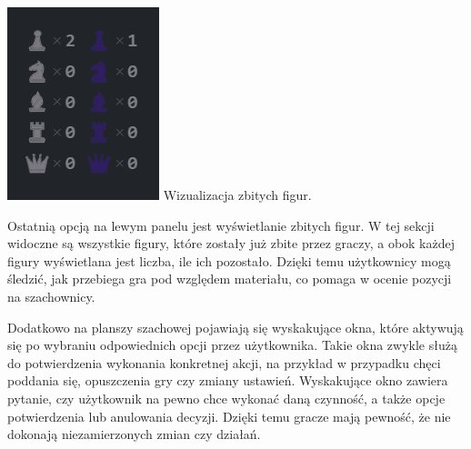 \documentclass[12pt,a4paper]{article}
\begin{document}
\begin{minipage}[t]{0.2\textwidth} 
    \vspace{0pt} 
    \centering 
    \includegraphics[width=\linewidth]{images/ins_min_capt.png} 
    Wizualizacja zbitych figur.
\end{minipage} 
\hfill 
\begin{minipage}[t]{0.7\textwidth} 
    \vspace{0pt} 
    \justifying 
    \noindent 
    Ostatnią opcją na lewym panelu jest wyświetlanie zbitych figur. W tej sekcji widoczne są wszystkie figury, które zostały już zbite przez graczy, a obok każdej figury wyświetlana jest liczba, ile ich pozostało. Dzięki temu użytkownicy mogą śledzić, jak przebiega gra pod względem materiału, co pomaga w ocenie pozycji na szachownicy.
\end{minipage}

\newpage

\noindent
Dodatkowo na planszy szachowej pojawiają się wyskakujące okna, które aktywują się po wybraniu odpowiednich opcji przez użytkownika. Takie okna zwykle służą do potwierdzenia wykonania konkretnej akcji, na przykład w przypadku chęci poddania się, opuszczenia gry czy zmiany ustawień. Wyskakujące okno zawiera pytanie, czy użytkownik na pewno chce wykonać daną czynność, a także opcje potwierdzenia lub anulowania decyzji. Dzięki temu gracze mają pewność, że nie dokonają niezamierzonych zmian czy działań.
\end{document}
